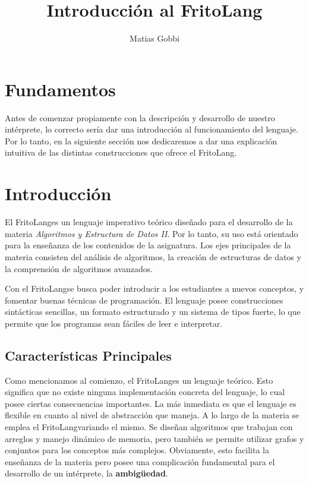 \documentclass{article}
\newcommand{\Lang}{FritoLang} %
\newcommand{\Materia}{\textit{Algoritmos y Estructura de Datos II}}
\begin{document}
\title{Introducción al \Lang}
\author{Matias Gobbi}
\maketitle

\section*{Fundamentos}
Antes de comenzar propiamente con la descripción y desarrollo de nuestro intérprete, lo correcto sería dar una introducción al funcionamiento del lenguaje.
Por lo tanto, en la siguiente sección nos dedicaremos a dar una explicación intuitiva de las distintas construcciones que ofrece el \Lang.

\section{Introducción}
El \Lang\space es un lenguaje imperativo teórico diseñado para el desarrollo de la materia \Materia.
Por lo tanto, su uso está orientado para la enseñanza de los contenidos de la asignatura.
Los ejes principales de la materia consisten del análisis de algoritmos, la creación de estructuras de datos y la comprensión de algoritmos avanzados.

Con el \Lang\space se busca poder introducir a los estudiantes a nuevos conceptos, y fomentar buenas técnicas de programación.
El lenguaje posee construcciones sintácticas sencillas, un formato estructurado y un sistema de tipos fuerte, lo que permite que los programas sean fáciles de leer e interpretar.

\subsection{Características Principales}
Como mencionamos al comienzo, el \Lang\space es un lenguaje teórico.
Esto significa que no existe ninguna implementación concreta del lenguaje, lo cual posee ciertas consecuencias importantes.
La más inmediata es que el lenguaje es flexible en cuanto al nivel de abstracción que maneja.
A lo largo de la materia se emplea el \Lang\space variando el mismo.
Se diseñan algoritmos que trabajan con arreglos y manejo dinámico de memoria, pero también se permite utilizar grafos y conjuntos para los conceptos más complejos.
Obviamente, esto facilita la enseñanza de la materia pero posee una complicación fundamental para el desarrollo de un intérprete, la \textbf{ambigüedad}.
\end{document}
